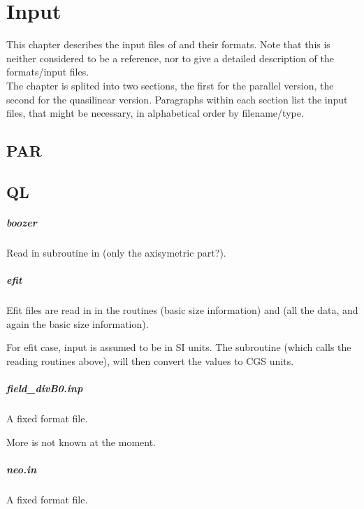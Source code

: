 \chapter{Input\label{ch:input}}
This chapter describes the input files of \neotwo and their formats.
Note that this is neither considered to be a reference, nor to give a
detailed description of the formats/input files.\\
The chapter is splited into two sections, the first for the parallel
version, the second for the quasilinear version. Paragraphs within each
section list the input files, that might be necessary, in alphabetical
order by filename/type.

\section{PAR}


\section{QL}


\paragraph{boozer}
Read in subroutine  in  (only
the axisymetric part?).

\paragraph{efit}
Efit files are read in  in the routines
 (basic size information) and
 (all the data, and again the basic size
information).

For efit case, input is assumed to be in SI units. The subroutine
 (which calls the reading routines above), will
then convert the values to CGS units.

\paragraph{field_divB0.inp}
A fixed format file.

More is not known at the moment.

\paragraph{neo.in}
A fixed format file.

